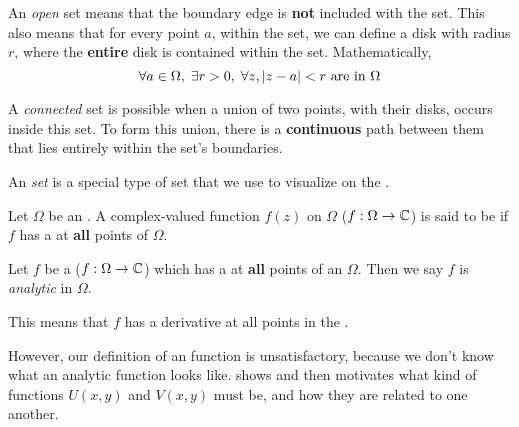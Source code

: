 \begin{definition}[Open]\label{def:Open}
  An \emph{open} set means that the boundary edge is \textbf{not} included with the set.
  This also means that for every point $a$, within the set, we can define a disk with radius $r$, where the \textbf{entire} disk is contained within the set.
  Mathematically,
  \begin{equation*}
    \forall a \in \Omega, \; \exists r > 0, \; \forall z, \lvert z-a \rvert < r \text{ are in $\Omega$}
  \end{equation*}
\end{definition}

\begin{definition}[Connected]\label{def:Connected}
  A \emph{connected} set is possible when a union of two points, with their disks, occurs inside this set.
  To form this union, there is a \textbf{continuous} path between them that lies entirely within the set's boundaries.
\end{definition}

\begin{definition}\label{def:Open_Connected_Set}
  An \emph{  set} is a special type of set that we use to visualize on the .
\end{definition}

\begin{theorem}
  Let $\Omega$ be an .
  A complex-valued function $f(z)$ on $\Omega$ ($f: \Omega \to \operatorname{\mathbb{C}}$) is said to be  if $f$ has a  at \textbf{all} points of $\Omega$.
\end{theorem}

\begin{definition}[Analytic]\label{def:Analytic}
  Let $f$ be a  ($f: \Omega \to \operatorname{\mathbb{C}}$) which has a  at \textbf{all} points of an  $\Omega$.
  Then we say $f$ is \emph{analytic} in $\Omega$.

  This means that $f$ has a derivative at all points in the .
\end{definition}

However, our definition of an  function is unsatisfactory, because we don't know what an analytic function looks like.
 shows and then motivates what kind of functions $U(x, y)$ and $V(x, y)$ must be, and how they are related to one another.

